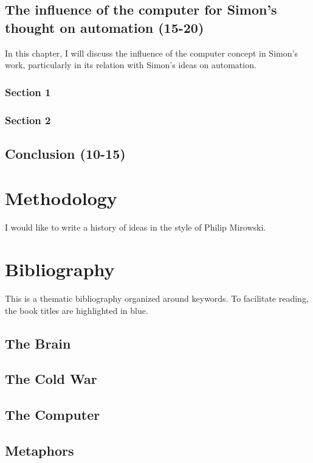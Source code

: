 \documentclass[draft=false, paper=A4,portrait,twoside=true,twocolumn=false,headinclude=false,footinclude=false,fontsize=11,BCOR=15mm,DIV=calc,pagesize=auto,titlepage=firstiscover,mpinclude=true,headings=big,headings=twolinechapter,open=right,chapterprefix=false,headsepline=false,parskip=full]{scrbook}
\begin{document}
\subsection{The influence of the computer for Simon's thought on automation (15-20)}
\label{sec:orgdf6be8b}
In this chapter, I will discuss the influence of the computer concept in
Simon's work, particularly in its relation with Simon's ideas on
automation.
\subsubsection{Section 1}
\label{sec:orge4f28e8}
\subsubsection{Section 2}
\label{sec:org40508e6}
\subsection{Conclusion (10-15)}
\label{sec:orga613438}
\section{Methodology}
\label{sec:org625faa6}
I would like to write a history of ideas in the style of Philip Mirowski. 
\section{Bibliography}
\label{sec:org37e55d9}
This is a thematic bibliography organized around keywords. To facilitate
reading, the book titles are highlighted in blue. 

\nocite{*}
\subsection{The Brain}
\label{sec:org57c41fc}
\printbibliography[heading=none,keyword=memoire,keyword=brain]
\subsection{The Cold War}
\label{sec:orge1e5205}
\printbibliography[heading=none,keyword=memoire,keyword=cold-war,notkeyword=brain]
\subsection{The Computer}
\label{sec:orgc34a5a2}
\printbibliography[heading=none,keyword=memoire,keyword=computer,notkeyword=brain,notkeyword=cold-war]
\subsection{Metaphors}
\label{sec:org1d03fa9}
\printbibliography[heading=none,keyword=memoire,keyword=metaphors,notkeyword=brain,notkeyword=cold-war,notkeyword=computer,notkeyword=cyborg]
\end{document}
